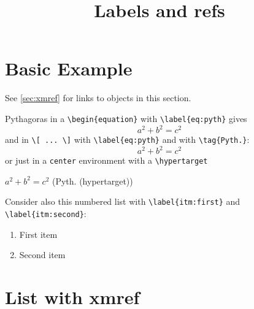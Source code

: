\documentclass{ximera}
\title{Labels and refs}
\begin{document}
\begin{abstract}
\end{abstract}
\maketitle
\label{xim:labels}



\section{Basic Example}
\label{sec:basic example}
See \autoref{sec:xmref} for links to objects in this section.


Pythagoras in a \verb|\begin{equation}| with \verb|\label{eq:pyth}| gives
\begin{equation}
  a^2 + b^2 = c^2   \label{eq:pyth}
\end{equation}
and in \verb|\[ ... \]| with \verb|\label{eq:pyth}| and with \verb|\tag{Pyth.}|:
\[
  a^2 + b^2 = c^2   \tag{Pyth.} \label{tag:pyth}
\]
or just in a \verb|center| environment with a \verb|\hypertarget|
\begin{center}
 \hfill\qquad $a^2 + b^2 = c^2$  \qquad \hfill  \hypertarget{ht:pyth}{(Pyth. (hypertarget))}
\end{center}

Consider also this numbered list with \verb|\label{itm:first}| and \verb|\label{itm:second}|:
\begin{enumerate}
  \item First item \label{itm:first}
  \item Second item \label{itm:second}
\end{enumerate}

\section{List with xmref}
\label{sec:xmref}
\end{document}
